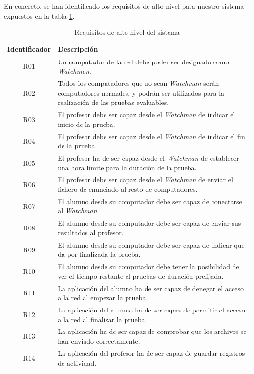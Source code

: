 En concreto, se han identificado los requisitos de alto nivel para nuestro sistema expuestos en la tabla \ref{tabla:requisitos}.


\begin{table}
\begin{tabular}{|c|p{10cm}|}
	\hline
	\textbf{Identificador} & \textbf{Descripción}
	\\ \hline

	R01 & Un computador de la red debe poder ser designado como \emph{Watchman}.
	\\ \hline

	R02 & Todos los computadores que no sean \emph{Watchman} serán computadores
	normales, y podrán ser utilizados para la realización de las pruebas evaluables.
	\\ \hline

	R03 & El profesor debe ser capaz desde el \emph{Watchman} de indicar el inicio de la prueba.
	\\ \hline

	R04 & El profesor debe ser capaz desde el \emph{Watchman} de indicar el fin de la prueba.
	\\ \hline

	R05 & El profesor ha de ser capaz desde el \emph{Watchman} de establecer una hora límite para la duración de la prueba.
	\\ \hline

	R06 & El profesor debe ser capaz desde el \emph{Watchman} de enviar el fichero de enunciado al resto de computadores.
	\\ \hline

	R07 & El alumno desde su computador debe ser capaz de conectarse al \emph{Watchman}.
	\\ \hline

	R08 & El alumno desde su computador debe ser capaz de enviar sus resultados al profesor.
	\\ \hline

	R09 & El alumno desde su computador debe ser capaz de indicar que da por finalizada la prueba.
	\\ \hline

	R10 & El alumno desde su computador debe tener la posibilidad de ver el tiempo restante el pruebas de duración prefijada.
	\\ \hline

	R11 & La aplicación del alumno ha de ser capaz de denegar el acceso a la red al empezar la prueba.
	\\ \hline

	R12 & La aplicación del alumno ha de ser capaz de permitir el acceso a la red al finalizar la prueba.
	\\ \hline

	R13 & La aplicación ha de ser capaz de comprobar que los archivos se han enviado correctamente.
	\\ \hline

	R14 & La aplicación del profesor ha de ser capaz de guardar registros de actividad.
	\\ \hline

\end{tabular}
\label{tabla:requisitos}
\caption{Requisitos de alto nivel del sistema}
\end{table}

